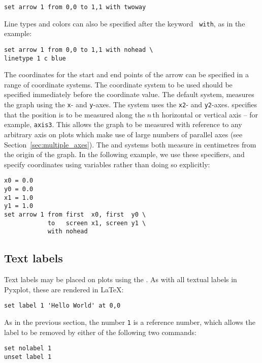 \begin{verbatim}
set arrow 1 from 0,0 to 1,1 with twoway
\end{verbatim}

\noindent Line types and colors can also be specified after the keyword {\tt
with}, as in the example:

\begin{verbatim}
set arrow 1 from 0,0 to 1,1 with nohead \
linetype 1 c blue
\end{verbatim}

The coordinates for the start and end points of the arrow can be specified in a
range of coordinate systems. The coordinate system to be used should be
specified immediately before the coordinate value. The default system,
\indcot{first} measures the graph using the {\tt x}- and {\tt y}-axes. The
\indcot{second} system uses the {\tt x2}- and {\tt y2}-axes. 
specifies that the position is to be measured along the $n\,$th horizontal or
vertical axis -- for example, {\tt axis3}.\indcmd{set arrow} This allows the
graph to be measured with reference to any arbitrary axis on plots which make
use of large numbers of parallel axes (see Section~\ref{sec:multiple_axes}).
The \indcot{page} and \indcot{graph} systems both measure in centimetres from
the origin of the graph. In the following example, we use these specifiers, and
specify coordinates using variables rather than doing so explicitly:

\begin{verbatim}
x0 = 0.0
y0 = 0.0
x1 = 1.0
y1 = 1.0
set arrow 1 from first  x0, first  y0 \
            to   screen x1, screen y1 \
            with nohead
\end{verbatim}

\subsection{Text labels}

Text labels may be placed on plots using the . As with all
textual labels in Pyxplot, these are rendered in \LaTeX:

\begin{verbatim}
set label 1 'Hello World' at 0,0
\end{verbatim}

As in the previous section, the number {\tt 1} is a reference number, which
allows the label to be removed by either of the following two commands:

\begin{verbatim}
set nolabel 1
unset label 1
\end{verbatim}

